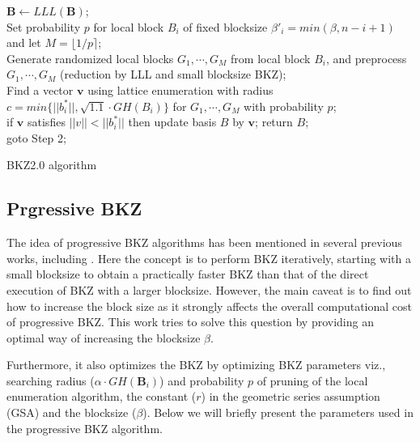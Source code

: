 \begin{algorithm}[h!]
$\pmb{B} \leftarrow LLL(\pmb{B})$; \\
{
    Set probability $p$ for local block $B_i$ of fixed blocksize $\beta'_i = min(\beta, n-i+1)$ and let $M =\lfloor 1/p \rceil$; \\
    Generate randomized local blocks $G_1, \cdots , G_M$ from local block $B_i$, and preprocess $G_1, \cdots , G_M$ (reduction by LLL and small blocksize BKZ); \\
    Find a vector $\pmb{v}$ using lattice enumeration with radius $c = min \{||b_i^{*}||, \sqrt{1.1} \cdot GH(B_i) \}$ for $G_1, \cdots , G_M$ with probability $p$; \\
    if $\pmb{v}$ satisfies $||v|| < ||b^{*}_i||$ then update basis $B$ by $\pmb{v}$;
}
    {
        return $B$; \\
    }
    {
        goto Step 2;\\
    }
\caption{BKZ2.0 algorithm}
\label{alg:BKZ20_algo}
\end{algorithm}






\subsection{Prgressive BKZ}
The idea of progressive BKZ algorithms has been mentioned in several previous works, including \cite{chen2011bkz,gama2008predicting,haque2019analyzing,schnorr2011accelerated,schnorr2012solving}.
Here the concept is to perform BKZ iteratively, starting with a small blocksize to obtain a practically faster BKZ than that of the direct execution of BKZ with a larger
blocksize.
However, the main caveat is to find out how to increase the block size as it strongly affects the overall computational cost of progressive BKZ.
This work tries to solve this question by providing an optimal way of increasing the blocksize $\beta$.

Furthermore, it also optimizes the BKZ by optimizing BKZ parameters viz., searching radius ($\alpha \cdot GH(\pmb{B}_i)$) and probability $p$ of pruning of the local enumeration algorithm, the constant ($r$) in the geometric series assumption (GSA) and the blocksize ($\beta$).
Below we will briefly present the parameters used in the progressive BKZ algorithm.

